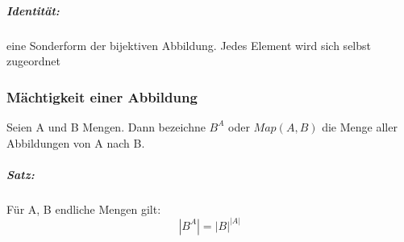 \documentclass[a4paper,12pt, DIV12]{scrartcl}
\begin{document}
\subparagraph*{Identität:} eine Sonderform der bijektiven Abbildung. Jedes Element wird sich selbst zugeordnet
\subsubsection{Mächtigkeit einer Abbildung}
Seien A und B Mengen.
Dann bezeichne $B^A$ oder $Map(A,B)$ die Menge aller Abbildungen von A nach B.
\subparagraph*{Satz:}
Für A, B endliche Mengen gilt:
$$ |B^A| = {|B|}^{|A|} $$
\end{document}
